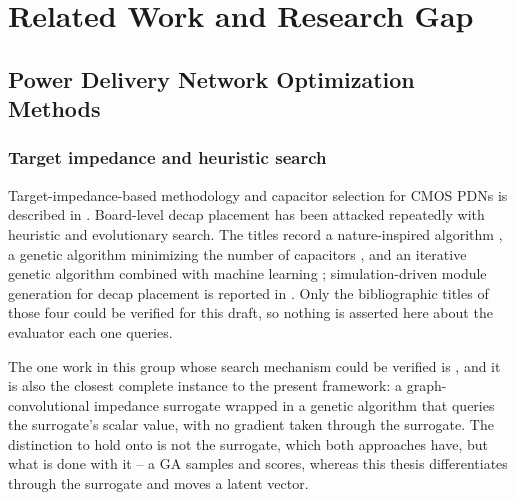 
\section{Related Work and Research Gap}
\label{sec:related_work}

\subsection{Power Delivery Network Optimization Methods}
\label{subsec:pdn_opt_methods}

\subsubsection*{Target impedance and heuristic search}

Target-impedance-based methodology and capacitor selection for CMOS PDNs is
described in \cite{smith1999target}. Board-level decap placement has been
attacked repeatedly with heuristic and evolutionary search. The titles record a
nature-inspired algorithm \cite{electronics2019nature}, a genetic algorithm
minimizing the number of capacitors \cite{ga2020minimum}, and an iterative
genetic algorithm combined with machine learning
\cite{electronics2020iterative}; simulation-driven module generation for decap
placement is reported in \cite{ars2023ai}. Only the bibliographic titles of those
four could be verified for this draft, so nothing is asserted here about the
evaluator each one queries.

The one work in this group whose search mechanism could be verified is
\cite{convga2024gcn}, and it is also the closest complete instance to the present
framework: a graph-convolutional impedance surrogate wrapped in a genetic
algorithm that queries the surrogate's scalar value, with no gradient taken
through the surrogate. The distinction to hold onto is not the surrogate, which
both approaches have, but what is done with it -- a GA samples and scores,
whereas this thesis differentiates through the surrogate and moves a latent
vector.

